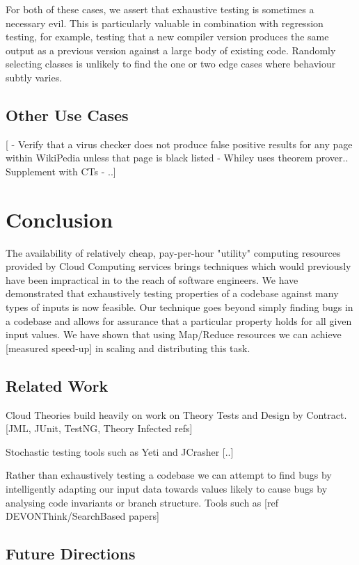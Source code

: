 \documentclass[10pt,journal,cspaper,compsoc]{IEEEtran}
\begin{document}
For both of these cases, we assert that exhaustive testing is sometimes a necessary evil. This is particularly valuable in combination with regression testing, for example, testing that a new compiler version produces the same output as a previous version against a large body of existing code. Randomly selecting classes is unlikely to find the one or two edge cases where behaviour subtly varies. 

\subsection{Other Use Cases}

[ - Verify that a virus checker does not produce false positive results for any page within WikiPedia unless that page is black listed 
  - Whiley uses theorem prover.. Supplement with CTs
- ..]

\section{Conclusion}

The availability of relatively cheap, pay-per-hour "utility" computing resources provided by Cloud Computing services brings techniques which would previously have been impractical in to the reach of software engineers. We have demonstrated that exhaustively testing properties of a codebase against many types of inputs is now feasible. Our technique goes beyond simply finding bugs in a codebase and allows for assurance that a particular property holds for all given input values. We have shown that using Map/Reduce resources we can achieve [measured speed-up] in scaling and distributing this task. 
\\

\subsection{Related Work}

Cloud Theories build heavily on work on Theory Tests and Design by Contract. [JML, JUnit, TestNG, Theory Infected refs]

Stochastic testing tools such as Yeti and JCrasher [..]

Rather than exhaustively testing a codebase we can attempt to find bugs by intelligently adapting our input data towards values likely to cause bugs by analysing code invariants or branch structure. Tools such as [ref DEVONThink/SearchBased papers]

\subsection{Future Directions}
\end{document}
